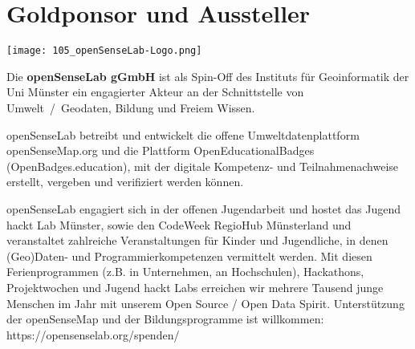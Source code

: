 \section*{Goldponsor und Aussteller}
\begin{flushright}
\texttt{[image: 105\_openSenseLab-Logo.png]}
\end{flushright}
\noindent
Die {\bfseries openSenseLab gGmbH} ist als Spin-Off des Instituts für Geoinformatik der Uni Münster ein engagierter Akteur an der Schnittstelle von Umwelt~/~Geodaten, Bildung und Freiem Wissen.    

\noindent
openSenseLab betreibt und entwickelt die offene Umweltdatenplattform openSenseMap.org und die Plattform OpenEducationalBadges (OpenBadges.education), mit der digitale Kompetenz- und Teilnahmenachweise erstellt, vergeben und verifiziert werden können. 

\noindent
openSenseLab engagiert sich in der offenen Jugendarbeit und hostet das Jugend hackt Lab Münster, sowie den CodeWeek RegioHub Münsterland und veranstaltet zahlreiche Veranstaltungen für Kinder und Jugendliche, in denen (Geo)Daten- und Programmierkompetenzen vermittelt werden. Mit diesen Ferienprogrammen (z.B. in Unternehmen, an Hochschulen), Hackathons, Projektwochen und Jugend hackt Labs erreichen wir mehrere Tausend junge Menschen im Jahr mit unserem Open Source / Open Data Spirit. Unterstützung der openSenseMap und der Bildungsprogramme ist willkommen: https://opensenselab.org/spenden/
